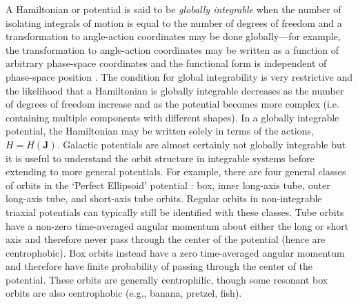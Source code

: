 \documentclass[letterpaper,12pt,preprint]{aastex}
\newcommand{\chchchanges}[1]{#1}
\begin{document}
A Hamiltonian or potential is said to be \emph{globally integrable} when the number of isolating integrals of motion is equal to the number of degrees of freedom and a transformation to angle-action coordinates may be done globally---for example, the transformation to angle-action coordinates may be written as a function of arbitrary phase-space coordinates and the functional form is independent of phase-space position \citep[e.g.,][]{goldstein80}. The condition for global integrability is very restrictive and the likelihood that a Hamiltonian is globally integrable decreases as the number of degrees of freedom increase \citep[e.g.,][]{lichtenberg83} and as the potential becomes more complex (i.e. containing multiple components with different shapes). In a globally integrable potential, the Hamiltonian may be written solely in terms of the actions, $H = H(\boldsymbol{J})$. Galactic potentials are almost certainly not globally integrable but it is useful to understand the orbit structure in integrable systems before extending to more general potentials. \chchchanges{For example, there are four general classes of orbits in the `Perfect Ellipsoid' potential \citep[an integrable triaxial potential and special case of the St\"ackel potential; see, e.g.,][]{kuzmin73, deZeeuw85}: box, inner long-axis tube, outer long-axis tube, and short-axis tube orbits. Regular orbits in non-integrable triaxial potentials can typically still be identified with these classes. Tube orbits have a non-zero time-averaged angular momentum about either the long or short axis and therefore never pass through the center of the potential (hence are centrophobic). Box orbits instead have a zero time-averaged angular momentum and therefore have finite probability of passing through the center of the potential. These orbits are generally centrophilic, though some resonant box orbits are also centrophobic (e.g., banana, pretzel, fish).}
\end{document}
